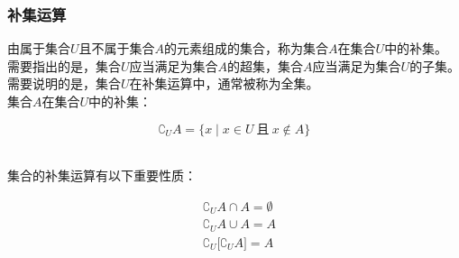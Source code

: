 \documentclass[UTF8]{ctexart}
\begin{document}
\newpage

\subsubsection{补集运算}
    由属于集合$U$且不属于集合$A$的元素组成的集合，称为集合$A$在集合$U$中的补集。\\[3mm]
    需要指出的是，集合$U$应当满足为集合$A$的超集，集合$A$应当满足为集合$U$的子集。\\[3mm]
    需要说明的是，集合$U$在补集运算中，通常被称为全集。\\[4mm]
    集合$A$在集合$U$中的补集：
    \begin{large}
        \begin{equation*}
            \complement_UA=\big\{ x\mid x\in U~\text{且}~x\notin A\big\}
        \end{equation*}
    \end{large}\\
    集合的补集运算有以下重要性质：
    \begin{large}
        \begin{align*}
            &\complement_UA\cap A=\emptyset\\[3mm]
            &\complement_UA\cup A=A\\[3mm]
            &\complement_U\big[\complement_UA\big]=A
        \end{align*}
    \end{large}
\end{document}
